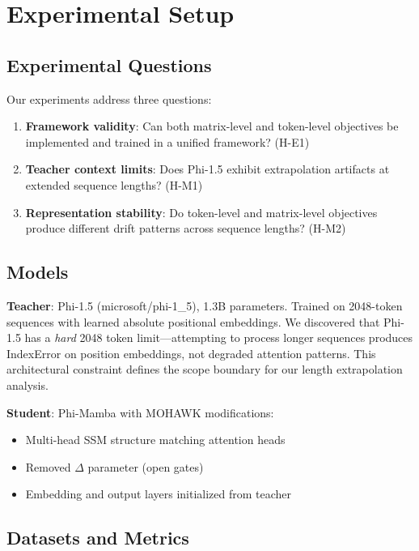 \section{Experimental Setup}
\label{sec:experiments}

\subsection{Experimental Questions}

Our experiments address three questions:

\begin{enumerate}
    \item \textbf{Framework validity}: Can both matrix-level and token-level objectives be implemented and trained in a unified framework? (H-E1)
    \item \textbf{Teacher context limits}: Does Phi-1.5 exhibit extrapolation artifacts at extended sequence lengths? (H-M1)
    \item \textbf{Representation stability}: Do token-level and matrix-level objectives produce different drift patterns across sequence lengths? (H-M2)
\end{enumerate}

\subsection{Models}

\textbf{Teacher}: Phi-1.5 (microsoft/phi-1\_5), 1.3B parameters. Trained on 2048-token sequences with learned absolute positional embeddings. We discovered that Phi-1.5 has a \textit{hard} 2048 token limit---attempting to process longer sequences produces IndexError on position embeddings, not degraded attention patterns. This architectural constraint defines the scope boundary for our length extrapolation analysis.

\textbf{Student}: Phi-Mamba with MOHAWK modifications:
\begin{itemize}
    \item Multi-head SSM structure matching attention heads
    \item Removed $\Delta$ parameter (open gates)
    \item Embedding and output layers initialized from teacher
\end{itemize}

\subsection{Datasets and Metrics}

